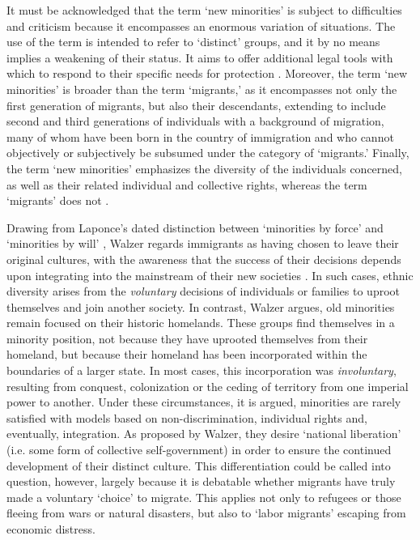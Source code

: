 \documentclass[output=paper,colorlinks,citecolor=brown]{langscibook}
\begin{document}
It must be acknowledged that the term `new minorities' is subject to difficulties and criticism because it encompasses an enormous variation of situations. The use of the term is intended to refer to `distinct' groups, and it by no means implies a weakening of their status. It aims to offer additional legal tools with which to respond to their specific needs for protection \citep{acfc2016,acfc2001a}. Moreover, the term `new minorities' is broader than the term `migrants,' as it encompasses not only the first generation of migrants, but also their descendants, extending to include second and third generations of individuals with a background of migration, many of whom have been born in the country of immigration and who cannot objectively or subjectively be subsumed under the category of `migrants.' Finally, the term `new minorities' emphasizes the diversity of the individuals concerned, as well as their related individual and collective rights, whereas the term `migrants' does not \citep{medda-windischer2017}.

Drawing from Laponce's dated distinction between `minorities by force' and `minorities by will' \citep{laponce1960}, Walzer regards immigrants as having chosen to leave their original cultures, with the awareness that the success of their decisions depends upon integrating into the mainstream of their new societies \citep{walzer1995}. In such cases, ethnic diversity arises from the \textit{voluntary} decisions of individuals or families to uproot themselves and join another society. In contrast, Walzer argues, old minorities remain focused on their historic homelands. These groups find themselves in a minority position, not because they have uprooted themselves from their homeland, but because their homeland has been incorporated within the boundaries of a larger state. In most cases, this incorporation was \textit{involuntary}, resulting from conquest, colonization or the ceding of territory from one imperial power to another. Under these circumstances, it is argued, minorities are rarely satisfied with models based on non-discrimination, individual rights and, eventually, integration. As proposed by Walzer, they desire `national liberation' (i.e. some form of collective self-government) in order to ensure the continued development of their distinct culture. This differentiation could be called into question, however, largely because it is debatable whether migrants have truly made a voluntary `choice' to migrate. This applies not only to refugees or those fleeing from wars or natural disasters, but also to `labor migrants' escaping from economic distress.
\end{document}
